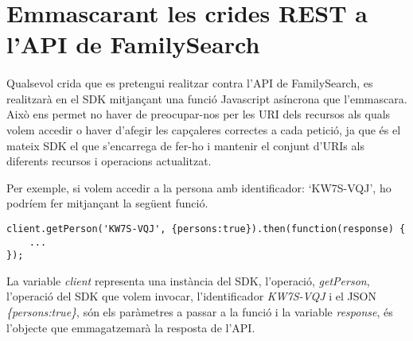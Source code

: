 \section{Emmascarant les crides REST a l'API de FamilySearch}

    \paragraph{}
    Qualsevol crida que es pretengui realitzar contra l’API de FamilySearch, es realitzarà en el SDK mitjançant una funció Javascript asíncrona que l'emmascara. Això ens permet no haver de preocupar-nos per les URI dels recursos als quals volem accedir o haver d'afegir les capçaleres correctes a cada petició, ja que és el mateix SDK el que s'encarrega de fer-ho i mantenir el conjunt d'URIs als diferents recursos i operacions actualitzat.

    Per exemple, si volem accedir a la persona amb identificador: `KW7S-VQJ', ho podríem fer mitjançant la següent funció.

\begin{lstlisting}[style=rawOwn,caption={Exempla crida emmascarada a l'API de FamilySearch}]
client.getPerson('KW7S-VQJ', {persons:true}).then(function(response) {
    ...
});
\end{lstlisting}

    La variable \emph{client} representa una instància del SDK, l’operació, \emph{getPerson}, l’operació del SDK que volem invocar, l’identificador \emph{KW7S-VQJ} i el JSON \emph{\{persons:true\}}, són els paràmetres a passar a la funció i la variable \emph{response}, és l’objecte que emmagatzemarà la resposta de l’API.
